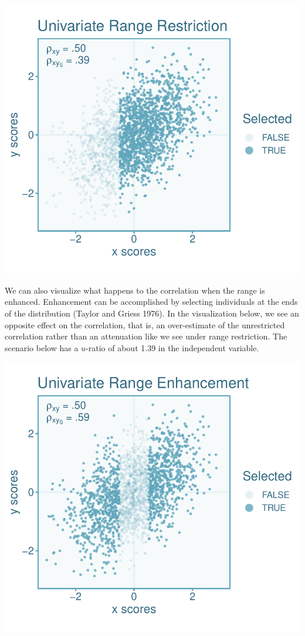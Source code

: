 \documentclass[
  letterpaper,
  DIV=11,
  numbers=noendperiod]{scrreprt}
\begin{document}
\includegraphics{indirect_range_restriction_files/figure-pdf/unnamed-chunk-2-1.pdf}

We can also visualize what happens to the correlation when the range is
enhanced. Enhancement can be accomplished by selecting individuals at
the ends of the distribution (Taylor and Griess 1976). In the
visualization below, we see an opposite effect on the correlation, that
is, an over-estimate of the unrestricted correlation rather than an
attenuation like we see under range restriction. The scenario below has
a \(u\)-ratio of about 1.39 in the independent variable.

\includegraphics{indirect_range_restriction_files/figure-pdf/unnamed-chunk-3-1.pdf}
\end{document}
